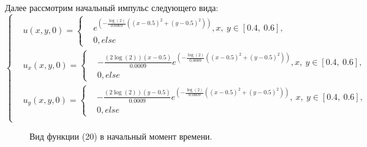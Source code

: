 \documentclass[14pt]{article}
\begin{document}
Далее рассмотрим начальный импульс следующего вида:
\begin{equation}
\left\lbrace
\begin{aligned}
&u(x,y,0) = \left\lbrace \begin{aligned}
&e^{(- \frac{\log(2)}{0.0009}((x - 0.5)^2 +(y - 0.5)^2))}, x,\:y \in [0.4,\:0.6],\\
&0, else
\end{aligned}
\right . \\
&u_x(x,y,0) = \left\lbrace \begin{aligned}
&-\frac{( 2 \log(2))(x - 0.5)}{0.0009}e^{(- \frac{\log(2)}{0.0009}((x - 0.5)^2 +(y - 0.5)^2))}, x,\:y \in [0.4,\:0.6],\\
&0, else
\end{aligned}
\right . \\
&u_y(x,y,0) =  \left\lbrace \begin{aligned}
&-\frac{( 2 \log(2))(y - 0.5)}{0.0009}e^{(- \frac{\log(2)}{0.0009}((x - 0.5)^2 +(y - 0.5)^2))},\:x,\:y \in [0.4,\:0.6],\\
&0, else
\end{aligned}
\right . \\
\end{aligned}
\right .
\end{equation}
\begin{figure}[H]
\caption{Вид функции (20) в начальный момент времени.}
\end{figure}
\end{document}
